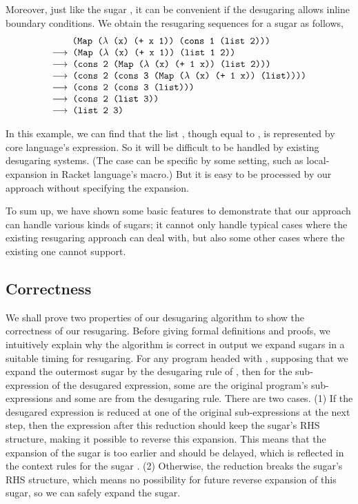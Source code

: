Moreover, just like the sugar , it can be convenient if the desugaring allows inline boundary conditions. We obtain the resugaring sequences for a  sugar as follows,
\[
	\begin{array}{l}
		\quad\;\;\Code{ (Map ($\lambda$ (x) (+ x 1)) (cons 1 (list 2)))}\\
			\OneStep{ \Code{ (Map ($\lambda$ (x) (+ x 1)) (list 1 2))}}\\
			\OneStep{ \Code{ (cons 2 (Map ($\lambda$ (x) (+ 1 x)) (list 2)))}}\\
			\OneStep{ \Code{ (cons 2 (cons 3 (Map ($\lambda$ (x) (+ 1 x)) (list))))}}\\
			\OneStep{ \Code{ (cons 2 (cons 3 (list)))}}\\
			\OneStep{ \Code{ (cons 2 (list 3))}}\\
			\OneStep{ \Code{ (list 2 3)}}\\
	\end{array}
\]

In this example, we can find that the list , though equal to , is represented by core language's expression. So it will be difficult to be handled by existing desugaring systems. (The case can be specific by some setting, such as local-expansion\cite{10.1017/S0956796812000093} in Racket language's macro.) But it is easy to be processed by our approach without specifying the expansion.

\medskip
To sum up, we have shown some basic features to demonstrate that our approach can handle various kinds of sugars; it cannot only handle typical cases where the existing resugaring approach can deal with, but also some other cases where the existing one cannot support.

\subsection{Correctness}
\label{mark:correct}


We shall prove two properties of our desugaring algorithm to show the correctness of our resugaring. Before giving formal definitions and proofs, we intuitively explain why the algorithm is correct in output we expand sugars in a suitable timing for resugaring. For any program headed with , supposing that we expand the outermost sugar by the desugaring rule of , then for the sub-expression of the desugared expression, some are the original program's sub-expressions and some are from the desugaring rule.
There are two cases.
(1) If the desugared expression is reduced at one of the original sub-expressions at the next step,  then the expression after this reduction should keep the sugar's RHS structure, making it possible to reverse this expansion.
This means that the expansion of the sugar  is too earlier and should be delayed, which is reflected in the context rules for the sugar .
(2) Otherwise, the reduction breaks the sugar's RHS structure, which means no possibility for future reverse expansion of this sugar, so we can safely expand the sugar.

